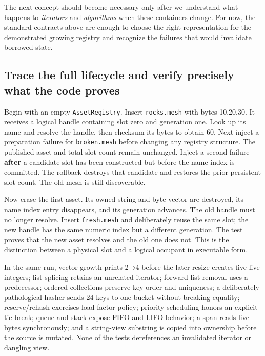 The next concept should become necessary only after we understand what happens to \emph{iterators} and \emph{algorithms} when these containers change. For now, the standard contracts above are enough to choose the right representation for the demonstrated growing registry and recognize the failures that would invalidate borrowed state.

\subsection{Trace the full lifecycle and verify precisely what the code proves}\label{01-foundations-i-ch006-trace-the-full-lifecycle-and-verify-precisely-what-the-code-proves}

Begin with an empty \texttt{AssetRegistry}. Insert \texttt{rocks.mesh} with bytes 10,20,30. It receives a logical handle containing slot zero and generation one. Look up its name and resolve the handle, then checksum its bytes to obtain 60. Next inject a preparation failure for \texttt{broken.mesh} before changing any registry structure. The published asset and total slot count remain unchanged. Inject a second failure \textbf{after} a candidate slot has been constructed but before the name index is committed. The rollback destroys that candidate and restores the prior persistent slot count. The old mesh is still discoverable.

Now erase the first asset. Its owned string and byte vector are destroyed, its name index entry disappears, and its generation advances. The old handle must no longer resolve. Insert \texttt{fresh.mesh} and deliberately reuse the same slot; the new handle has the same numeric index but a different generation. The test proves that the new asset resolves and the old one does not. This is the distinction between a physical slot and a logical occupant in executable form.

In the same run, vector growth prints 2→4 before the later resize creates five live integers; list splicing retains an unrelated iterator; forward-list removal uses a predecessor; ordered collections preserve key order and uniqueness; a deliberately pathological hasher sends 24 keys to one bucket without breaking equality; reserve/rehash exercises load-factor policy; priority scheduling honors an explicit tie break; queue and stack expose FIFO and LIFO behavior; a span reads live bytes synchronously; and a string-view substring is copied into ownership before the source is mutated. None of the tests dereferences an invalidated iterator or dangling view.

